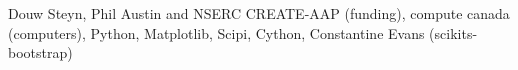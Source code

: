 \begin{acknowledgements}
Douw Steyn, Phil Austin and NSERC CREATE-AAP (funding), compute canada (computers), Python, Matplotlib, Scipi, Cython, Constantine Evans (scikits-bootstrap) 
\end{acknowledgements}







